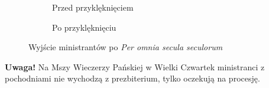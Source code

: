 \newpage

\begin{figure}[ht]
	\begin{subfigure}[t]{.5\linewidth}
		\centering{}%
		\caption{Przed przyklęknięciem}
		\label{fig:wyjscie_1}
	\end{subfigure}\qquad
	\begin{subfigure}[t]{.5\linewidth}
		\centering\usebox{\imagebox}
		\caption{Po przyklęknięciu}
		\label{fig:wyjscie_2}
	\end{subfigure}
	\caption{Wyjście ministrantów po \textit{Per omnia secula seculorum}}
\end{figure}

\textbf{Uwaga!} Na Mszy Wieczerzy Pańskiej w Wielki Czwartek ministranci z
pochodniami nie wychodzą z prezbiterium, tylko oczekują na procesję.